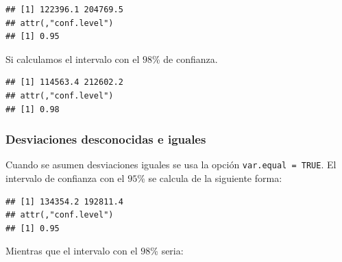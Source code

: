 \documentclass[
]{krantz}
\makeatletter
\newenvironment{Shaded}{\begin{snugshade}}{\end{snugshade}}
\newcommand{\DataTypeTok}[1]{\textcolor[rgb]{0.27,0.27,0.27}{#1}}
\newcommand{\FloatTok}[1]{\textcolor[rgb]{0.06,0.06,0.06}{#1}}
\newcommand{\KeywordTok}[1]{\textcolor[rgb]{0.27,0.27,0.27}{\textbf{#1}}}
\newcommand{\NormalTok}[1]{#1}
\newcommand{\OperatorTok}[1]{\textcolor[rgb]{0.43,0.43,0.43}{\textbf{#1}}}
\newcommand{\OtherTok}[1]{\textcolor[rgb]{0.37,0.37,0.37}{#1}}
\newenvironment{kframe}{%
\medskip{}
\setlength{\fboxsep}{.8em}
 \def\at@end@of@kframe{}%
 \ifinner\ifhmode%
  \def\at@end@of@kframe{\end{minipage}}%
  \begin{minipage}{\columnwidth}%
 \fi\fi%
 \def\FrameCommand##1{\hskip\@totalleftmargin \hskip-\fboxsep
 \colorbox{shadecolor}{##1}\hskip-\fboxsep
     \hskip-\linewidth \hskip-\@totalleftmargin \hskip\columnwidth}%
 \MakeFramed {\advance\hsize-\width
   \@totalleftmargin\z@ \linewidth\hsize
   \@setminipage}}%
 {\par\unskip\endMakeFramed%
 \at@end@of@kframe}
\renewenvironment{Shaded}{\begin{kframe}}{\end{kframe}}
\makeatother
\begin{document}
\begin{verbatim}
## [1] 122396.1 204769.5
## attr(,"conf.level")
## [1] 0.95
\end{verbatim}

Si calculamos el intervalo con el \(98\)\% de confianza.

\begin{Shaded}
\end{Shaded}

\begin{verbatim}
## [1] 114563.4 212602.2
## attr(,"conf.level")
## [1] 0.98
\end{verbatim}

\hypertarget{desviaciones-desconocidas-e-iguales-1}{%
\subsubsection{Desviaciones desconocidas e iguales}\label{desviaciones-desconocidas-e-iguales-1}}

Cuando se asumen desviaciones iguales se usa la opción \texttt{var.equal\ =\ TRUE}. El intervalo de confianza con el \(95\)\% se calcula de la siguiente forma:

\begin{Shaded}
\end{Shaded}

\begin{verbatim}
## [1] 134354.2 192811.4
## attr(,"conf.level")
## [1] 0.95
\end{verbatim}

Mientras que el intervalo con el \(98\)\% seria:

\begin{Shaded}
\end{Shaded}
\end{document}
